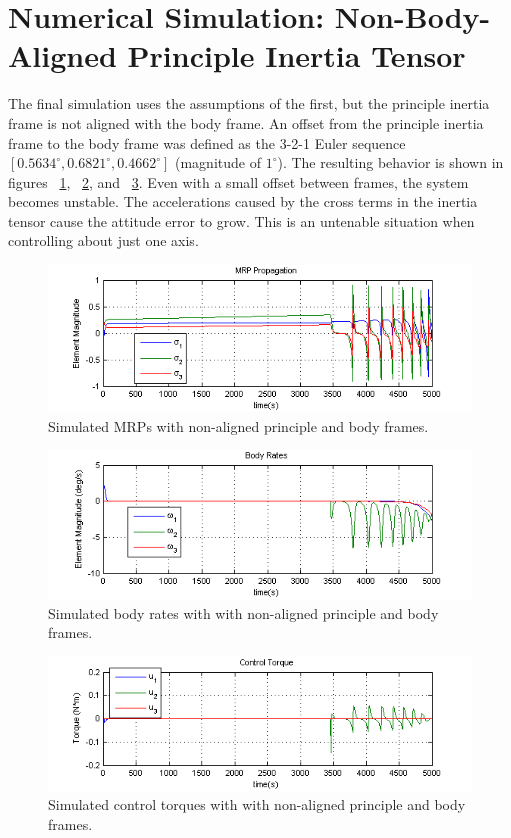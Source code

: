 \documentclass[paper]{aiaaNew}
\begin{document}
\section{Numerical Simulation: Non-Body-Aligned Principle Inertia Tensor}
The final simulation uses the assumptions of the first, but the principle inertia frame is not aligned with the body frame. An offset from the principle inertia frame to the body frame was defined as the 3-2-1 Euler sequence $[0.5634^{\circ}, 0.6821^{\circ}, 0.4662^{\circ}]$ (magnitude of $1^{\circ}$). The resulting behavior is shown in figures ~\ref{fig:IOffMRP},  ~\ref{fig:IOffRates}, and  ~\ref{fig:IOffU}. Even with a small offset between frames, the system becomes unstable.  The accelerations caused by the cross terms in the inertia tensor cause the attitude error to grow.  This is an untenable situation when controlling about just one axis.
 \begin{figure}[htb]
 	\centering
 	\includegraphics[]{Figures/IOffMRP}
 	\caption{Simulated MRPs with non-aligned principle and body frames.}
 	\label{fig:IOffMRP}
 \end{figure}
 \begin{figure}[htb]
 	\centering
 	\includegraphics[]{Figures/IOffRates}
 	\caption{Simulated body rates with with non-aligned principle and body frames.}
 	\label{fig:IOffRates}
 \end{figure}
 \begin{figure}[htb]
 	\centering
 	\includegraphics[]{Figures/IOffU}
 	\caption{Simulated control torques with with non-aligned principle and body frames.}
 	\label{fig:IOffU}
 \end{figure}
\par
\end{document}

